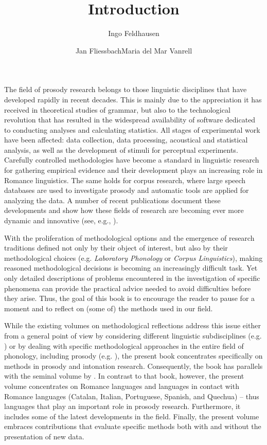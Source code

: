 \documentclass[output=paper]{langsci/langscibook}
\title{Introduction}
\author{Ingo Feldhausen\affiliation{Goethe-Universität Frankfurt am Main}\and Jan Fliessbach\affiliation{Freie Universität Berlin}\lastand Maria del Mar Vanrell\affiliation{Universitat de les Illes Balears}}
\begin{document}
\label{chap:intro}
The field of prosody research belongs to those linguistic disciplines that have developed rapidly in recent decades. This is mainly due to the appreciation it has received in theoretical studies of grammar, but also to the technological revolution that has resulted in the widespread availability of software dedicated to conducting analyses and calculating statistics. All stages of experimental work have been affected: data collection, data processing, acoustical and statistical analysis, as well as the development of stimuli for perceptual experiments. Carefully controlled methodologies have become a standard in linguistic research for gathering empirical evidence and their development plays an increasing role in Romance linguistics. The same holds for corpus research, where large speech databases are used to investigate prosody and automatic tools are applied for analyzing the data. A number of recent publications document these developments and show how these fields of research are becoming ever more dynamic and innovative (see, e.g., \citealt{Sudhoff.2006,Cohn.2012,Durand.2014}). 

With the proliferation of methodological options and the emergence of research traditions defined not only by their object of interest, but also by their methodological choices (e.g. \textit{Laboratory Phonology} or \textit{Corpus Linguistics}), making reasoned methodological decisions is becoming an increasingly difficult task. Yet only detailed descriptions of problems encountered in the investigation of specific phenomena can provide the practical advice needed to avoid difficulties before they arise. Thus, the goal of this book is to encourage the reader to pause for a moment and to reflect on (some of) the methods used in our field.

While the existing volumes on methodological reflections address this issue either from a general point of view by considering different linguistic subdisciplines (e.g. \citealt{Ender.2012,Podesva.2013}) or by dealing with specific methodological approaches in the entire field of phonology, including prosody (e.g. \citealt{Cohn.2012,Nguyen.2013,Durand.2014}), the present book concentrates specifically on methods in prosody and intonation research. Consequently, the book has parallels with the seminal volume by \citet{Sudhoff.2006}. In contrast to that book, however, the present volume concentrates on Romance languages and languages in contact with Romance languages (Catalan, Italian, Portuguese, Spanish, and Quechua) – thus languages that play an important role in prosody research. Furthermore, it includes some of the latest developments in the field. Finally, the present volume embraces contributions that evaluate specific methods both with and without the presentation of new data.
\end{document}
